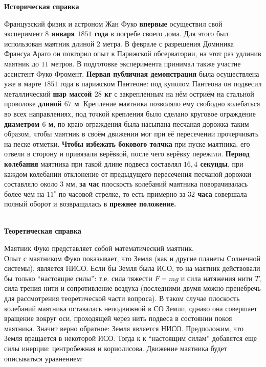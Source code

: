 \documentclass[11pt]{article}
\begin{document}
\begin{center}
	\textbf{{\large Историческая справка}}
\end{center}
Французский физик и астроном Жан Фуко \textbf{впервые} осуществил свой эксперимент \textbf{$8$ января $1851$ года} в погребе своего дома. Для этого был использован маятник длиной 2 метра. В феврале с разрешения Доминика Франсуа Араго он повторил опыт в Парижской обсерватории, на этот раз удлинив маятник до $11$ метров. В подготовке эксперимента принимал также участие ассистент Фуко Фромент. \textbf{Первая публичная демонстрация} была осуществлена уже в марте $1851$ года в парижском Пантеоне: под куполом Пантеона он подвесил металлический \textbf{шар массой $28$ кг} с закрепленным на нём остриём на стальной проволоке \textbf{длиной $67$ м}. Крепление маятника позволяло ему свободно колебаться во всех направлениях, под точкой крепления было сделано круговое ограждение \textbf{диаметром $6$ м}, по краю ограждения была насыпана песчаная дорожка таким образом, чтобы маятник в своём движении мог при её пересечении прочерчивать на песке отметки. \textbf{Чтобы избежать бокового толчка} при пуске маятника, его отвели в сторону и привязали верёвкой, после чего верёвку пережгли. \textbf{Период колебания} маятника при такой длине подвеса составлял \textbf{$16,4$ секунды}, при каждом колебании отклонение от предыдущего пересечения песчаной дорожки составляло около $3$ мм, \textbf{за час} плоскость колебаний маятника поворачивалась более чем на \textbf{$11^{\circ}$} по часовой стрелке, то есть примерно за \textbf{$32$ часа} совершала полный оборот и возвращалась в \textbf{прежнее положение.}\\
\\
\begin{center}
	\textbf{{\large Теоретическая справка}}
\end{center}
Маятник Фуко представляет собой математический маятник.\\
Опыт с маятником Фуко показывает, что Земля (как и другие планеты Солнечной системы), является НИСО. Если бы Земля была ИСО, то на маятник действовали бы только “настоящие силы”: т.е. сила тяжести $F=mg$ и сила натяжения нити $T$, сила трения нити и сопротивление воздуха (последними двумя можно пренебречь для рассмотрения теоретической части вопроса). В таком случае плоскость колебаний маятника оставалась неподвижной в СО Земли, однако она совершает вращение вокруг оси, проходящей через нить подвеса в состоянии покоя маятника. Значит верно обратное: Земля является НИСО. Предположим, что Земля вращается в некоторой ИСО. Тогда к к “настоящим силам” добавятся еще силы инерции: центробежная и кориолисова. Движение маятника будет описываться уравнением:\\
\end{document}
